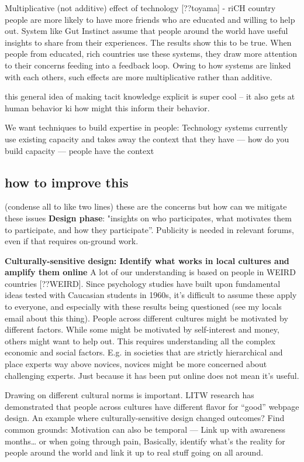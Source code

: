 Multiplicative (not additive) effect of technology [??toyama] - riCH country people are more likely to have more friends who are educated and willing to help out. System like Gut Instinct assume that people around the world have useful insights to share from their experiences. The results show this to be true. When people from educated, rich countries use these systems, they draw more attention to their concerns feeding into a feedback loop. Owing to how systems are linked with each others, such effects are more multiplicative rather than additive. 

     this general idea of making tacit knowledge explicit is super cool -- it also gets at human behavior ki how might this inform their behavior.

We want techniques to build expertise in people: Technology systems currently use existing capacity and takes away the context that they have — how do you build capacity — people have the context

\subsection{how to improve this}
(condense all to like two lines)
these are the concerns but how can we mitigate these issues
\textbf{Design phase}: "insights on who participates, what motivates them to participate, and how they participate”. Publicity is needed in relevant forums, even if that requires on-ground work.

\textbf{Culturally-sensitive design: Identify what works in local cultures and amplify them online}
A lot of our understanding is based on people in WEIRD countries [??WEIRD]. Since psychology studies have built upon fundamental ideas tested with Caucasian students in 1960s, it’s difficult to assume these apply to everyone, and especially with these results being questioned (see my locals email about this thing). People across different cultures might be motivated by different factors. While some might be motivated by self-interest and money, others might want to help out.  This requires understanding all the complex economic and social factors. E.g. in societies that are strictly hierarchical and place experts way above novices, novices might be more concerned about challenging experts. Just because it has been put online does not mean it’s useful. 

Drawing on different cultural norms is important. LITW research has demonstrated that people across cultures have different flavor for “good” webpage design. An example where culturally-sensitive design changed outcomes?
Find common grounds: Motivation can also be temporal — Link up with awareness months… or when going through pain, Basically, identify what’s the reality for people around the world and link it up to real stuff going on all around. 

